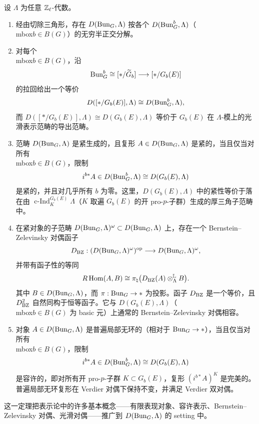 \begin{theorem}%
设 $\Lambda$ 为任意 $\mathbb{Z}_\ell$-代数。
\begin{enumerate}
\item[(i)] 经由切除三角形，存在 $D(\mathrm{Bun}_G,\Lambda)$ 按各个 $D(\mathrm{Bun}^b_G,\Lambda)$（\\mbox{$b\in B(G)$}）的无穷半正交分解。
\item[(ii)] 对每个 \\mbox{$b\in B(G)$}，沿
\[
\mathrm{Bun}^b_G\cong[*/\widetilde{G}_b]\longrightarrow[*/G_b(E)]
\]
的拉回给出一个等价
\[
D([*/G_b(E)],\Lambda)\cong D(\mathrm{Bun}^b_G,\Lambda),
\]
而 $D([*/G_b(E)],\Lambda)\cong D(G_b(E),\Lambda)$ 等价于 $G_b(E)$ 在 $\Lambda$-模上的光滑表示范畴的导出范畴。
\item[(iii)] 范畴 $D(\mathrm{Bun}_G,\Lambda)$ 是紧生成的，且复形 $A\in D(\mathrm{Bun}_G,\Lambda)$ 是紧的，当且仅当对所有 \\mbox{$b\in B(G)$}，限制
\[
i^{b*}A\in D(\mathrm{Bun}^b_G,\Lambda)\cong D(G_b(E),\Lambda)
\]
是紧的，并且对几乎所有 $b$ 为零。这里，$D(G_b(E),\Lambda)$ 中的紧性等价于落在由 $\operatorname{c-Ind}_K^{G_b(E)}\Lambda$（$K$ 取遍 $G_b(E)$ 的开 pro-$p$-子群）生成的厚三角子范畴中。
\item[(iv)] 在紧对象的子范畴 $D(\mathrm{Bun}_G,\Lambda)^\omega\subset D(\mathrm{Bun}_G,\Lambda)$ 上，存在一个 Bernstein–Zelevinsky 对偶函子
\[
D_{\mathrm{BZ}}:(D(\mathrm{Bun}_G,\Lambda)^\omega)^{\mathrm{op}}\longrightarrow D(\mathrm{Bun}_G,\Lambda)^\omega,
\]
并带有函子性的等同
\[
R\operatorname{Hom}(A,B)\cong\pi_\natural\bigl(D_{\mathrm{BZ}}(A)\otimes^{\mathbb{L}}_\Lambda B\bigr).
\]
其中 $B\in D(\mathrm{Bun}_G,\Lambda)$，而 $\pi:\mathrm{Bun}_G\to *$ 为投影。函子 $D_{\mathrm{BZ}}$ 是一个等价，且 $D_{\mathrm{BZ}}^2$ 自然同构于恒等函子。它与 $D(G_b(E),\Lambda)$（\\mbox{$b\in B(G)$} 为 basic 元）上通常的 Bernstein–Zelevinsky 对偶相容。
\item[(v)] 对象 $A\in D(\mathrm{Bun}_G,\Lambda)$ 是普遍局部无环的（相对于 $\mathrm{Bun}_G\to *$），当且仅当对所有 \\mbox{$b\in B(G)$}，限制
\[
i^{b*}A\in D(\mathrm{Bun}^b_G,\Lambda)\cong D(G_b(E),\Lambda)
\]
是容许的，即对所有开 pro-$p$-子群 $K\subset G_b(E)$，复形 $(i^{b*}A)^K$ 是完美的。普遍局部无环复形在 Verdier 对偶下保持不变，并满足 Verdier 双对偶。
\end{enumerate}
\end{theorem}


这一定理把表示论中的许多基本概念——有限表现对象、容许表示、Bernstein–Zelevinsky 对偶、光滑对偶——推广到 $D(\mathrm{Bun}_G,\Lambda)$ 的 setting 中。

